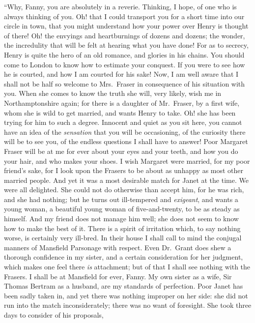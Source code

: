 \documentclass{article}
\begin{document}
``Why, Fanny, you are absolutely in a reverie.
Thinking, I hope, of one who is always thinking of you.
Oh! that I could transport you for a short time into
our circle in town, that you might understand how your
power over Henry is thought of there!  Oh! the envyings
and heartburnings of dozens and dozens; the wonder,
the incredulity that will be felt at hearing what you
have done!  For as to secrecy, Henry is quite the hero
of an old romance, and glories in his chains.  You should
come to London to know how to estimate your conquest.
If you were to see how he is courted, and how I am courted
for his sake!  Now, I am well aware that I shall not be
half so welcome to Mrs.\ Fraser in consequence of his
situation with you.  When she comes to know the truth
she will, very likely, wish me in Northamptonshire again;
for there is a daughter of Mr.\ Fraser, by a first wife,
whom she is wild to get married, and wants Henry to take.
Oh! she has been trying for him to such a degree.
Innocent and quiet as you sit here, you cannot have an
idea of the \emph{sensation} that you will be occasioning,
of the curiosity there will be to see you, of the endless
questions I shall have to answer!  Poor Margaret Fraser
will be at me for ever about your eyes and your teeth,
and how you do your hair, and who makes your shoes.
I wish Margaret were married, for my poor friend's sake,
for I look upon the Frasers to be about as unhappy as most
other married people.  And yet it was a most desirable
match for Janet at the time.  We were all delighted.
She could not do otherwise than accept him, for he was rich,
and she had nothing; but he turns out ill-tempered
and \emph{exigeant}, and wants a young woman, a beautiful young
woman of five-and-twenty, to be as steady as himself.
And my friend does not manage him well; she does not seem
to know how to make the best of it.  There is a spirit
of irritation which, to say nothing worse, is certainly
very ill-bred. In their house I shall call to mind the
conjugal manners of Mansfield Parsonage with respect.
Even Dr.\ Grant does shew a thorough confidence in my sister,
and a certain consideration for her judgment, which makes
one feel there \emph{is} attachment; but of that I shall
see nothing with the Frasers.  I shall be at Mansfield
for ever, Fanny.  My own sister as a wife, Sir Thomas
Bertram as a husband, are my standards of perfection.
Poor Janet has been sadly taken in, and yet there was
nothing improper on her side:  she did not run into the
match inconsiderately; there was no want of foresight.
She took three days to consider of his proposals,
\end{document}

